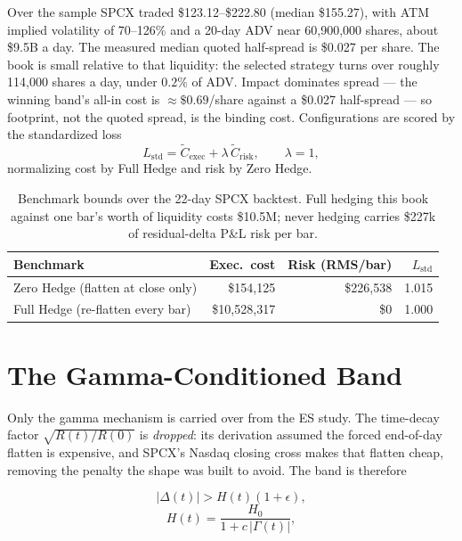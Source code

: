 \documentclass[11pt]{article}
\begin{document}
Over the sample SPCX traded \$123.12--\$222.80 (median \$155.27), with ATM implied
volatility of 70--126\% and a 20-day ADV near 60{,}900{,}000 shares, about \$9.5B a
day. The measured median quoted half-spread is \$0.027 per share. The book is small
relative to that liquidity: the selected strategy turns over roughly 114{,}000 shares a
day, under $0.2\%$ of ADV. Impact dominates spread --- the winning band's all-in cost is
$\approx\$0.69$/share against a \$0.027 half-spread --- so footprint, not the quoted
spread, is the binding cost. Configurations are scored by the standardized loss
\[
L_{\text{std}} = \widetilde{C}_{\text{exec}} + \lambda\,\widetilde{C}_{\text{risk}},
\qquad \lambda = 1,
\]
normalizing cost by Full Hedge and risk by Zero Hedge.

\begin{table}[htbp]
\centering
\small
\begin{tabular}{lrrr}
\toprule
\textbf{Benchmark} & \textbf{Exec.\ cost} & \textbf{Risk (RMS/bar)} & $L_{\text{std}}$ \\
\midrule
Zero Hedge (flatten at close only) & \$154{,}125     & \$226{,}538 & 1.015 \\
Full Hedge (re-flatten every bar)  & \$10{,}528{,}317 & \$0         & 1.000 \\
\bottomrule
\end{tabular}
\caption{Benchmark bounds over the 22-day SPCX backtest. Full hedging this book against
one bar's worth of liquidity costs \$10.5M; never hedging carries \$227k of
residual-delta P\&L risk per bar.}
\end{table}

\section{The Gamma-Conditioned Band}

Only the gamma mechanism is carried over from the ES study. The time-decay factor
$\sqrt{R(t)/R(0)}$ is \emph{dropped}: its derivation assumed the forced end-of-day
flatten is expensive, and SPCX's Nasdaq closing cross makes that flatten cheap, removing
the penalty the shape was built to avoid. The band is therefore

\begin{eqbox}
\begin{equation}
\lvert \Delta(t) \rvert > H(t)(1+\epsilon),
\end{equation}
\begin{equation}
H(t) = \frac{H_0}{1 + c\,\lvert\Gamma(t)\rvert},
\end{equation}
\end{eqbox}
\end{document}
